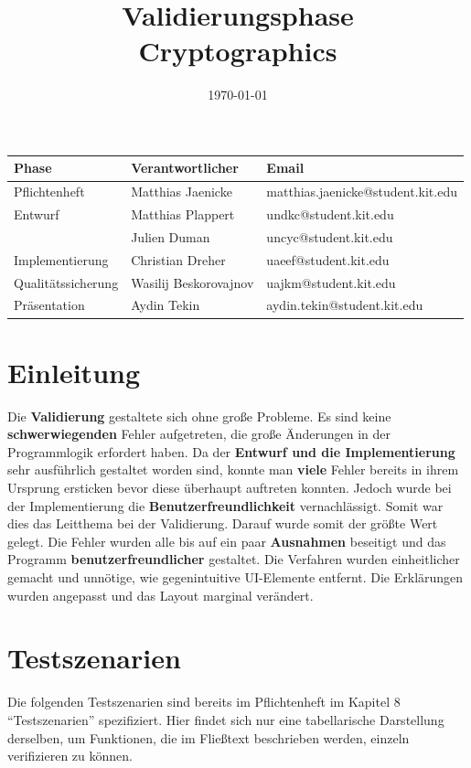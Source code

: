 \documentclass{article}
\title{\textbf{Validierungsphase} \\ Cryptographics}
\author{}
\date{\today}
\begin{document}
\maketitle
\begin{table}[b]
  \begin{tabular}{| l | l | l |}
    \hline
    \textbf{Phase} & \textbf{Verantwortlicher} & \textbf{Email} \\ \hline
    Pflichtenheft & Matthias Jaenicke & matthias.jaenicke@student.kit.edu \\ \hline
    Entwurf & Matthias Plappert & undkc@student.kit.edu \\
            & Julien Duman & uncyc@student.kit.edu \\ \hline
    Implementierung & Christian Dreher & uaeef@student.kit.edu \\ \hline
    Qualitätssicherung & Wasilij Beskorovajnov & uajkm@student.kit.edu \\ \hline
    Präsentation & Aydin Tekin & aydin.tekin@student.kit.edu \\ \hline
    \end{tabular}
\end{table}
\thispagestyle{empty}
\newpage

\tableofcontents
\newpage

\section{Einleitung}
	 Die \textbf{Validierung} gestaltete sich ohne große Probleme. Es sind keine \textbf{schwerwiegenden} Fehler aufgetreten, die große Änderungen in der Programmlogik 
	 erfordert haben. Da der \textbf{Entwurf und die Implementierung} sehr ausführlich gestaltet worden sind, konnte man \textbf{viele} Fehler bereits in ihrem Ursprung 
	 ersticken bevor diese überhaupt auftreten konnten. Jedoch wurde bei der Implementierung die \textbf{Benutzerfreundlichkeit} vernachlässigt. Somit war
	 dies das Leitthema bei der Validierung. Darauf wurde somit der größte Wert gelegt.\newline
	 Die Fehler wurden alle bis auf ein paar \textbf{Ausnahmen} beseitigt und das Programm \textbf{benutzerfreundlicher} gestaltet. Die Verfahren wurden einheitlicher
	 gemacht und unnötige, wie gegenintuitive UI-Elemente entfernt. Die Erklärungen wurden angepasst und das Layout marginal verändert.


\section{Testszenarien}
  Die folgenden Testszenarien sind bereits im Pflichtenheft im Kapitel 8 ``Testszenarien'' spezifiziert. Hier
  findet sich nur eine tabellarische Darstellung derselben, um Funktionen, die im Fließtext beschrieben werden,
  einzeln verifizieren zu können.
  
\end{document}
